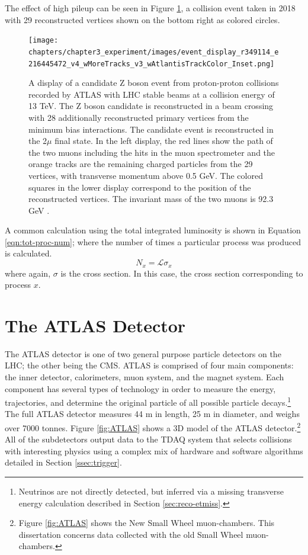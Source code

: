 		The effect of high pileup can be seen in Figure \ref{fig:high-pileup-event-display}, a collision event taken in 2018 with 29 reconstructed vertices shown on the bottom right as colored circles.
		\begin{figure}[!ht]
		\centering
		\texttt{[image: chapters/chapter3\_experiment/images/event\_display\_r349114\_e216445472\_v4\_wMoreTracks\_v3\_wAtlantisTrackColor\_Inset.png]}
		\caption{ A display of a candidate Z boson event from proton-proton collisions recorded by \gls{ATLAS} with \gls{LHC} stable beams at a collision energy of 13 TeV. The Z boson candidate is reconstructed in a beam crossing with 28 additionally reconstructed primary vertices from the minimum bias interactions. The candidate event is reconstructed in the 2$\mu$ final state. In the left display, the red lines show the path of the two muons including the hits in the muon spectrometer and the orange tracks are the remaining charged particles from the 29 vertices, with transverse momentum above 0.5 GeV. The colored squares in the lower display correspond to the position of the reconstructed vertices. The invariant mass of the two muons is 92.3 GeV \cite{eventdisplayrun2physics}. }
		\label{fig:high-pileup-event-display}
		\end{figure}


		A common calculation using the total integrated luminosity is shown in Equation \ref{eqn:tot-proc-num}; where the number of times a particular process was produced is calculated.
		\begin{equation}\label{eqn:tot-proc-num}
		N_{x} = \mathcal{L} \sigma_{x}
		\end{equation}
		where again, $\sigma$ is the cross section. In this case, the cross section corresponding to process $x$.


\section{The \gls{ATLAS} Detector}\label{sec:ATLAS}
	The \acrfull{ATLAS} detector is one of two general purpose particle detectors on the \gls{LHC}; the other being the \acrfull{CMS}. \gls{ATLAS} is comprised of four main components: the inner detector, calorimeters, muon system, and the magnet system. Each component has several types of technology in order to measure the energy, trajectories, and determine the original particle of all possible particle decays.\footnote{Neutrinos are not directly detected, but inferred via a missing transverse energy calculation described in Section \ref{sec:reco-etmiss}.} The full \gls{ATLAS} detector measures 44 m in length, 25 m in diameter, and weighs over 7000 tonnes. Figure \ref{fig:ATLAS} shows a 3D model of the \gls{ATLAS} detector.\footnote{Figure \ref{fig:ATLAS} shows the New Small Wheel muon-chambers. This dissertation concerns data collected with the old Small Wheel muon-chambers.} All of the subdetectors output data to the \gls{TDAQ} system that selects collisions with interesting physics using a complex mix of hardware and software algorithms detailed in Section \ref{ssec:trigger}. 

